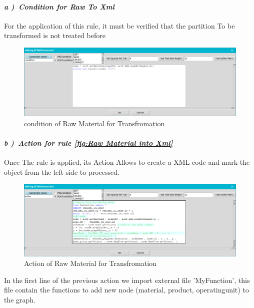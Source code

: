 \paragraph{\emph{ a )~Condition for Raw To Xml } } For the application of this rule, it must be verified that the partition To be transformed is not treated before
\vspace{1cm}
\begin{figure}[th]
	\centering %
 	\includegraphics[scale=0.38]{ch3/img/xcond1}
	\caption{\label{fig:condition of Raw Material for Transfromation}condition of Raw Material for Transfromation}
\end{figure}
\pagebreak
\paragraph{\emph{ b )~Action for rule \ref{fig:Raw Material into Xml} } } Once 
The rule is applied, its Action Allows to create a XML code and mark the object from the left side to processed. 
 
\begin{figure}[th]
	\centering %
 	\includegraphics[scale=0.38]{ch3/img/xact1}
	\caption{\label{fig:Action of Raw Material for Transfromation}Action of Raw Material for Transfromation}
\end{figure} 
In the first line of the previous action we import external file 'MyFunction', this file contain the functions to add new node (material, product, operatingunit) to the graph.

